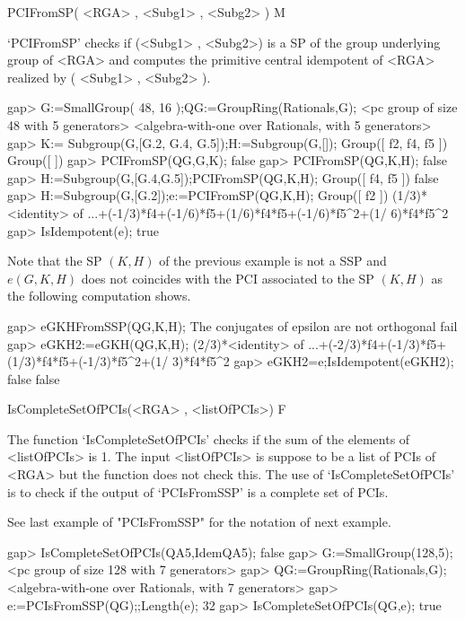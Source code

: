 \>PCIFromSP( <RGA> , <Subg1> , <Subg2> ) M


`PCIFromSP' checks if (<Subg1> , <Subg2>) is a SP of the group underlying 
group of <RGA> and computes the primitive central idempotent of <RGA> 
realized by ( <Subg1> , <Subg2> ). 

\beginexample
    gap> G:=SmallGroup( 48, 16 );QG:=GroupRing(Rationals,G);
    <pc group of size 48 with 5 generators>
    <algebra-with-one over Rationals, with 5 generators>
    gap> K:= Subgroup(G,[G.2, G.4, G.5]);H:=Subgroup(G,[]);
    Group([ f2, f4, f5 ])
    Group([  ])
    gap> PCIFromSP(QG,G,K);
    false
    gap> PCIFromSP(QG,K,H);
    false
    gap> H:=Subgroup(G,[G.4,G.5]);PCIFromSP(QG,K,H);
    Group([ f4, f5 ])
    false
    gap> H:=Subgroup(G,[G.2]);e:=PCIFromSP(QG,K,H);
    Group([ f2 ])
    (1/3)*<identity> of ...+(-1/3)*f4+(-1/6)*f5+(1/6)*f4*f5+(-1/6)*f5^2+(1/
    6)*f4*f5^2
    gap> IsIdempotent(e);
    true
\endexample

Note that the SP $(K,H)$ of the previous example is not a SSP and 
$e(G,K,H)$ does not coincides with the PCI associated to the SP $(K,H)$ as 
the following computation shows. 

\beginexample
    gap> eGKHFromSSP(QG,K,H);
    The conjugates of epsilon are not orthogonal
    fail
    gap> eGKH2:=eGKH(QG,K,H); 
    (2/3)*<identity> of ...+(-2/3)*f4+(-1/3)*f5+(1/3)*f4*f5+(-1/3)*f5^2+(1/
    3)*f4*f5^2
    gap> eGKH2=e;IsIdempotent(eGKH2);
    false
    false
\endexample


\>IsCompleteSetOfPCIs(<RGA> , <listOfPCIs>) F 

The function `IsCompleteSetOfPCIs' checks if the sum of the elements of <listOfPCIs> 
is 1. The input <listOfPCIs> is suppose to be a list of PCIs of <RGA> but the 
function does not check this. The use of `IsCompleteSetOfPCIs' is to check if the 
output of `PCIsFromSSP' is a complete set of PCIs. 

See last example of "PCIsFromSSP" for the notation of next example. 

\beginexample
    gap> IsCompleteSetOfPCIs(QA5,IdemQA5); 
    false
    gap> G:=SmallGroup(128,5);
    <pc group of size 128 with 7 generators>
    gap> QG:=GroupRing(Rationals,G);
    <algebra-with-one over Rationals, with 7 generators>
    gap> e:=PCIsFromSSP(QG);;Length(e);
    32
    gap> IsCompleteSetOfPCIs(QG,e);
    true
\endexample
